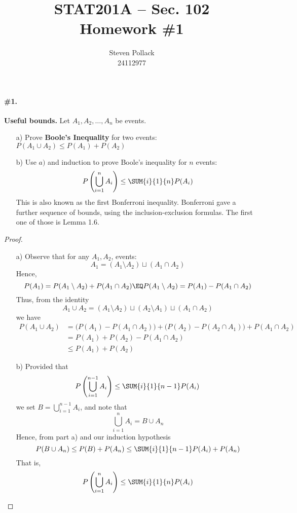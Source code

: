 \documentclass[12pt,titlepage]{article}
\title{STAT201A -- Sec. 102 \\ Homework \#1}
\author{Steven Pollack \\ 24112977}
\date{}
\begin{document}
\maketitle

\pagestyle{empty}
\newpage
\pagestyle{fancy}

\paragraph{\#1.} \textbf{Useful bounds.} Let $A_1, A_2, \ldots, A_n$ be events.
\begin{enumerate}
\item[a)] Prove \textbf{Boole's Inequality} for two events: $P(A_1 \cup A_2) \leq P(A_1) + P(A_2)$
\item[b)] Use $a)$ and induction to prove Boole's inequality for $n$ events:
\[
P\left( \bigcup_{i=1}^{n} A_i \right) \leq \SUM{i}{1}{n} P(A_i)
\]
This is also known as the first Bonferroni inequality. Bonferroni gave a further sequence of bounds, using the inclusion-exclusion formulas. The first one of those is Lemma 1.6.
\end{enumerate}

\begin{proof}
\begin{enumerate}
\item[a)] 
Observe that for any $A_1, A_2$, events:
\[
A_1 = (A_1 \setminus A_2) \sqcup (A_1 \cap A_2)
\]
Hence,
\[
P(A_1) = P(A_1 \setminus A_2) + P(A_1 \cap A_2) \EQ P(A_1 \setminus A_2) = P(A_1) - P(A_1 \cap A_2)
\]
Thus, from the identity
\[
A_1 \cup A_2 = (A_1 \setminus A_2) \sqcup (A_2 \setminus A_1) \sqcup (A_1 \cap A_2)
\]
we have 
\begin{align*}
P(A_1 \cup A_2) &= \biggl(P(A_1) - P(A_1 \cap A_2)\biggr) + \biggl(P(A_2) - P(A_2 \cap A_1)\biggr) + P(A_1 \cap A_2) \\
&= P(A_1) + P(A_2) - P(A_1 \cap A_2) \\
&\leq P(A_1) + P(A_2)
\end{align*}
\item[b)]Provided that 
\[
P\left( \bigcup_{i=1}^{n-1} A_i \right) \leq \SUM{i}{1}{n-1} P(A_i)
\]
we set $B = \bigcup_{i=1}^{n-1} A_i$, and note that
\[
\bigcup_{i=1}^{n} A_i = B \cup A_{n}
\]
Hence, from part a) and our induction hypothesis
\[
P(B \cup A_n) \leq P(B) + P(A_n) \leq \SUM{i}{1}{n-1} P(A_i) + P(A_n)
\]
That is, 
\[
P\left( \bigcup_{i=1}^{n} A_i \right) \leq \SUM{i}{1}{n} P(A_i)
\]
\end{enumerate}
\end{proof}
\end{document}
